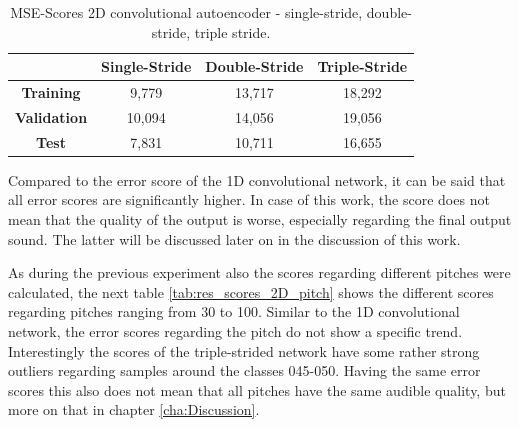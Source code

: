 \begin{table}[htb!]
    \centering
    \captionsetup{justification=centering}
    \begin{tabular}{|c|c|c|c|}
        \hline
         & \textbf{Single-Stride} & \textbf{Double-Stride} & \textbf{Triple-Stride} \\
         \hline
        \textbf{Training} & 9,779 & 13,717 & 18,292 \\
        \hline
        \textbf{Validation} & 10,094 & 14,056 & 19,056 \\
        \hline
        \textbf{Test} & 7,831 & 10,711 & 16,655 \\
        \hline
    \end{tabular}
    \caption{MSE-Scores 2D convolutional autoencoder - single-stride, double-stride, triple stride.}
    \label{tab:res_scores_2Dcae}
\end{table}

Compared to the error score of the 1D convolutional network, it can be said that all error scores are significantly higher. In case of this work, the score does not mean that the quality of the output is worse, especially regarding the final output sound. The latter will be discussed later on in the discussion of this work.

As during the previous experiment also the scores regarding different pitches were calculated, the next table \ref{tab:res_scores_2D_pitch} shows the different scores regarding pitches ranging from 30 to 100. Similar to the 1D convolutional network, the error scores regarding the pitch do not show a specific trend. Interestingly the scores of the triple-strided network have some rather strong outliers regarding samples around the classes 045-050. Having the same error scores this also does not mean that all pitches have the same audible quality, but more on that in chapter \ref{cha:Discussion}. 


